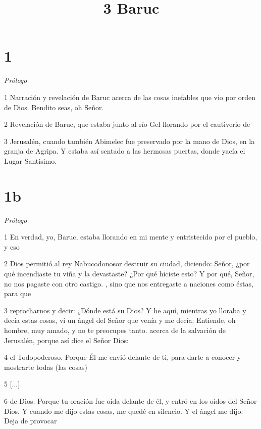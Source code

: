 

\title{3 Baruc}

\chapter{1}

\par \textit{Prólogo}

\par 1 Narración y revelación de Baruc acerca de las cosas inefables que vio por orden de Dios. Bendito seas, oh Señor.

\par 2 Revelación de Baruc, que estaba junto al río Gel llorando por el cautiverio de

\par 3 Jerusalén, cuando también Abimelec fue preservado por la mano de Dios, en la granja de Agripa. Y estaba así sentado a las hermosas puertas, donde yacía el Lugar Santísimo.

\chapter{1b}

\par \textit{Prólogo}

\par 1 En verdad, yo, Baruc, estaba llorando en mi mente y entristecido por el pueblo, y eso

\par 2 Dios permitió al rey Nabucodonosor destruir su ciudad, diciendo: Señor, ¿por qué incendiaste tu viña y la devastaste? ¿Por qué hiciste esto? Y por qué, Señor, no nos pagaste con otro castigo. , sino que nos entregaste a naciones como éstas, para que

\par 3 reprocharnos y decir: ¿Dónde está su Dios? Y he aquí, mientras yo lloraba y decía estas cosas, vi un ángel del Señor que venía y me decía: Entiende, oh hombre, muy amado, y no te preocupes tanto. acerca de la salvación de Jerusalén, porque así dice el Señor Dios:

\par 4 el Todopoderoso. Porque Él me envió delante de ti, para darte a conocer y mostrarte todas (las cosas)

\par 5 [...]

\par 6 de Dios. Porque tu oración fue oída delante de él, y entró en los oídos del Señor Dios. Y cuando me dijo estas cosas, me quedé en silencio. Y el ángel me dijo: Deja de provocar

